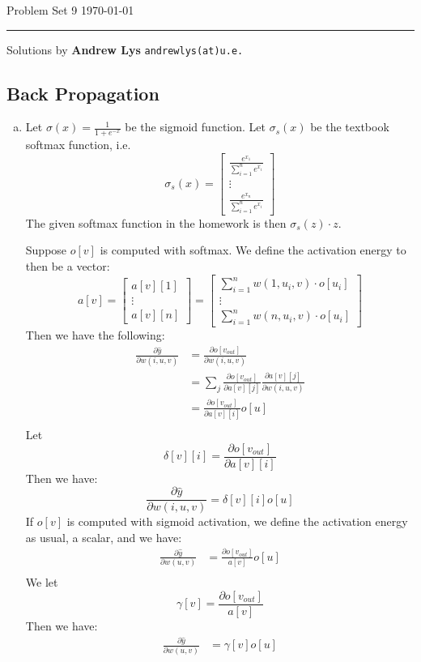 \documentclass{amsart}
\theoremstyle{definition}
\begin{document}
\noindent
Problem Set 9  \hfill \today  %
\smallskip
\hrule
\smallskip
\noindent
Solutions by {\bf Andrew Lys} \qquad   %
  {\tt andrewlys(at)u.e.}      %

\vspace{0.5cm}
\subsection{Back Propagation}
\begin{enumerate}[(a)]
  \item
    Let $\sigma(x) = \frac{1}{1 + e^{-x}}$ be the sigmoid function. Let $\sigma_s(x)$ be the textbook softmax function, i.e. 
    \[\sigma_s(x) = \begin{bmatrix}
      \frac{e^{x_1}}{\sum_{i=1}^n e^{x_i}} \\
      \vdots \\
      \frac{e^{x_n}}{\sum_{i=1}^n e^{x_i}}
    \end{bmatrix}
    \]
    The given softmax function in the homework is then $\sigma_s(z) \cdot z$.

    Suppose $o[v]$ is computed with softmax. We define the activation energy to then be a vector:
    \[
    a[v] = \begin{bmatrix}
      a[v][1] \\
      \vdots \\
      a[v][n]
    \end{bmatrix} = \begin{bmatrix}
      \sum_{i = 1}^{n} w(1, u_i, v) \cdot o[u_i] \\
      \vdots \\
      \sum_{i = 1}^{n} w(n, u_i, v) \cdot o[u_i]
    \end{bmatrix}
    \]
    Then we have the following:
    \begin{align*}
      \frac{\partial \hat{y}}{\partial w(i, u, v)} &= \frac{\partial o[v_{out}]}{\partial w(i, u, v)} \\
      &= \sum_{j} \frac{\partial o[v_{out}]}{\partial a[v][j]} \frac{\partial a[v][j]}{\partial w(i, u, v)} \\
      &= \frac{\partial o[v_{out}]}{\partial a[v][i]} o[u] \\
    \end{align*}
    Let 
    \[
    \delta[v][i] = \frac{\partial o[v_{out}]}{\partial a[v][i]}
    \]
    Then we have:
    \[
    \frac{\partial \hat{y}}{\partial w(i, u, v)} = \delta[v][i] o[u]
    \]
    If $o[v]$ is computed with sigmoid activation, we define the activation energy as usual, a scalar, and we have:
    \begin{align*}
      \frac{\partial\hat{y}}{\partial w(u,v)} &= \frac{\partial o[v_{out}]}{a[v]} o[u]\\
    \end{align*}
    We let 
    \[\gamma[v] = \frac{\partial o[v_{out}]}{a[v]}\]
    Then we have:
    \begin{align*}
      \frac{\partial\hat{y}}{\partial w(u,v)} &= \gamma[v] o[u]
    \end{align*}


\end{enumerate}
\end{document}
